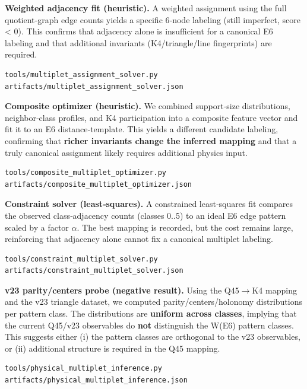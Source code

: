 \documentclass[11pt]{article}
\begin{document}
\textbf{Weighted adjacency fit (heuristic).} A weighted assignment using
the full quotient‑graph edge counts yields a specific 6‑node labeling
(still imperfect, score \textless{} 0). This confirms that adjacency
alone is insufficient for a canonical E6 labeling and that additional
invariants (K4/triangle/line fingerprints) are required.

\begin{verbatim}
tools/multiplet_assignment_solver.py
artifacts/multiplet_assignment_solver.json
\end{verbatim}

\textbf{Composite optimizer (heuristic).} We combined support‑size
distributions, neighbor‑class profiles, and K4 participation into a
composite feature vector and fit it to an E6 distance‑template. This
yields a different candidate labeling, confirming that \textbf{richer
invariants change the inferred mapping} and that a truly canonical
assignment likely requires additional physics input.

\begin{verbatim}
tools/composite_multiplet_optimizer.py
artifacts/composite_multiplet_optimizer.json
\end{verbatim}

\textbf{Constraint solver (least‑squares).} A constrained least‑squares
fit compares the observed class‑adjacency counts (classes 0..5) to an
ideal E6 edge pattern scaled by a factor \ensuremath{\alpha}. The best
mapping is recorded, but the cost remains large, reinforcing that
adjacency alone cannot fix a canonical multiplet labeling.

\begin{verbatim}
tools/constraint_multiplet_solver.py
artifacts/constraint_multiplet_solver.json
\end{verbatim}

\textbf{v23 parity/centers probe (negative result).} Using the
Q45\ensuremath{\rightarrow}K4 mapping and the v23 triangle dataset, we
computed parity/centers/holonomy distributions per pattern class. The
distributions are \textbf{uniform across classes}, implying that the
current Q45/v23 observables do \textbf{not} distinguish the W(E6)
pattern classes. This suggests either (i) the pattern classes are
orthogonal to the v23 observables, or (ii) additional structure is
required in the Q45 mapping.

\begin{verbatim}
tools/physical_multiplet_inference.py
artifacts/physical_multiplet_inference.json
\end{verbatim}
\end{document}
